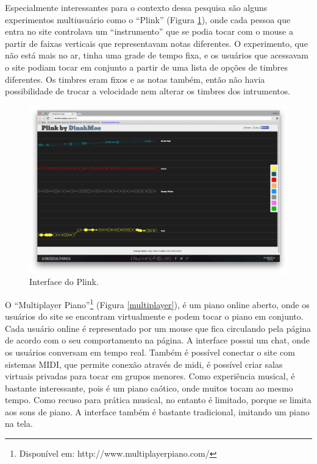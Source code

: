 Especialmente interessantes para o contexto dessa pesquisa são alguns experimentos multiusuário como o ``Plink'' (Figura \ref{plink}), onde cada pessoa que entra no site controlava um ``instrumento'' que se podia tocar com o mouse a partir de faixas verticais que representavam notas diferentes. O experimento, que não está mais no ar, tinha uma grade de tempo fixa, e os usuários que acessavam o site podiam tocar em conjunto a partir de uma lista de opções de timbres diferentes. Os timbres eram fixos e as notas também, então não havia possibilidade de trocar a velocidade nem alterar os timbres dos intrumentos. 

\begin{figure}
    \caption{\label{plink}Interface do Plink.}
    
        \includegraphics[width=1\linewidth]{pictures/cap2/plink}
    
\end{figure}

O ``Multiplayer Piano''\footnote{Disponível em: http://www.multiplayerpiano.com/} (Figura \ref{multiplayer}), é um piano online aberto, onde os usuários do site se encontram virtualmente e podem tocar o piano em conjunto. Cada usuário online é representado por um mouse que fica circulando pela página de acordo com o seu comportamento na página. A interface possui um chat, onde os usuários conversam em tempo real. Também é possível conectar o site com sistemas MIDI, que permite conexão através de midi, é possível criar salas virtuais privadas para tocar em grupos menores. Como experiência musical, é bastante interessante, pois é um piano caótico, onde muitos tocam ao mesmo tempo. Como recuso para prática musical, no entanto é limitado, porque se limita aos sons de piano. A interface também é bastante tradicional, imitando um piano na tela.


